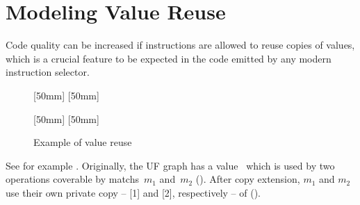 \section{Modeling Value Reuse}

Code quality can be increased if \glspl{instruction} are allowed to reuse copies
of values, which is a crucial feature to be expected in the code emitted by any
modern \gls{instruction selector}.
%
\begin{figure}
  \setlength{\opNodeDist}{12pt}%

  \mbox{}%
  \hfill%
                [50mm]%
                {}%
  \hfill%
                [50mm]%
                {}%
  \hfill%
  \mbox{}

  \vspace{\betweensubfigures}

  \mbox{}%
  \hfill%
                [50mm]%
                {%
                }%
  \hfill%
                [50mm]%
                {%
                }%
  \hfill%
  \mbox{}

  \caption{Example of value reuse}
\end{figure}
%
See for example .
%
Originally, the \gls{UF graph} has a value~ which is used by two
\glspl{operation} coverable by \glspl{match}~$m_1$ and~$m_2$
().
%
After \gls{copy extension}, $m_1$ and $m_2$ use their own private copy --
[1] and [2], respectively -- of 
().

